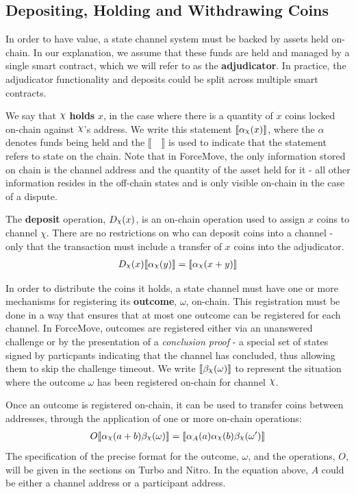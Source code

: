 \documentclass{article}
\DeclareRobustCommand{\rchi}{{\mathpalette\irchi\relax}}
\newcommand{\irchi}[2]{\raisebox{\depth}{$#1\chi$}} %
\theoremstyle{definition}
\newcommand{\adj}[1]{\llbracket #1 \rrbracket}
\begin{document}
\subsection{Depositing, Holding and Withdrawing Coins}

In order to have value, a state channel system must be backed by assets held on-chain.
In our explanation, we assume that these funds are held and managed by a single smart contract,
which we will refer to as the \textbf{adjudicator}.
In practice, the adjudicator functionality and deposits could be split across multiple smart contracts.

We say that $\rchi$ \textbf{holds} $x$, in the case where there is a quantity of $x$ coins
locked on-chain against $\rchi$'s address.
We write this statement $\adj{\alpha_\rchi(x)}$, where the $\alpha$ denotes funds being held
and the $\adj{\quad}$ is used to indicate that the statement refers to state on the chain.
Note that in ForceMove, the only information stored on chain is the channel address and the quantity of the asset held for it - all other information resides in the off-chain states and is only visible on-chain in the case of a dispute.

The \textbf{deposit} operation, $D_\rchi(x)$, is an on-chain operation used to assign $x$ coins to channel $\chi$.
There are no restrictions on who can deposit coins into a channel - only that the
transaction must include a transfer of $x$ coins into the adjudicator.
\begin{align*}
D_\rchi(x) \adj{\alpha_\rchi(y)} = \adj{\alpha_\rchi(x + y)}
\end{align*}

In order to distribute the coins it holds, a state channel must have one or more mechanisms for
registering its \textbf{outcome}, $\omega$, on-chain.
This registration must be done in a way that ensures that at most one outcome can be registered for each channel.
In ForceMove, outcomes are registered either via an unanswered challenge or by the presentation
of a \textit{conclusion proof} - a special set of states signed by particpants indicating
that the channel has concluded, thus allowing them to skip the challenge timeout.
We write  $\adj{\beta_\rchi(\omega)}$ to represent the situation where the outcome $\omega$
has been registered on-chain for channel $\rchi$.

Once an outcome is registered on-chain, it can be used to transfer coins between addresses,
through the application of one or more on-chain operations:
\begin{align*}
O \adj{\alpha_\rchi(a + b)\beta_\rchi(\omega)} = \adj{\alpha_A(a)\alpha_\rchi(b)\beta_\rchi(\omega')}
\end{align*}
The specification of the precise format for the outcome, $\omega$, and the operations, $O$,
will be given in the sections on Turbo and Nitro.
In the equation above, $A$ could be either a channel address or a participant address.
\end{document}
